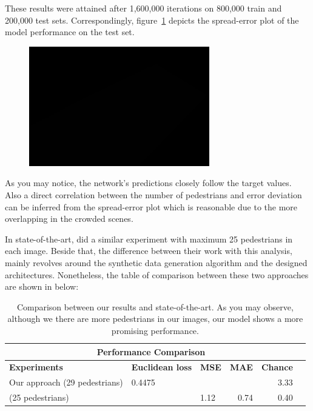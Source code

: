 These results were attained after 1,600,000 iterations on 800,000 train and 200,000 test sets. Correspondingly, figure~\ref{fig:splot} depicts the spread-error plot of the model performance on the test set.

\begin{figure}[H]
	\centering
	{\includegraphics[width=0.7\textwidth]{images/1}}
	\caption{}
	\label{fig:splot}
\end{figure}

As you may notice, the network's predictions closely follow the target values. Also a direct correlation between the number of pedestrians and error deviation can be inferred from the spread-error plot which is reasonable due to the more overlapping in the crowded scenes. 

\noindent In state-of-the-art, \citeauthor*{segui2015learning} did a similar experiment with maximum 25 pedestrians in each image. Beside that, the difference between their work with this analysis, mainly revolves around the synthetic data generation algorithm and the designed architectures. Nonetheless, the table of comparison between these two approaches are shown in below:
 
\begin{table}[H]
\centering
\small\sffamily
\begin{tabular}{lllrrr}
\multicolumn{5}{c}{\textbf{\textbf{Performance Comparison}}} \\
\bottomrule
\textbf{Experiments} &\textbf{Euclidean loss}&\textbf{MSE} &\textbf{MAE}& \textbf{Chance} \\
\bottomrule
Our approach (29 pedestrians)              & 0.4475    &      &          & 3.33 \\
\citet{segui2015learning} (25 pedestrians) &           & 1.12 & 0.74     & 0.40 \\
\bottomrule
\end{tabular}
\caption{Comparison between our results and state-of-the-art. As you may observe, although we there are more pedestrians in our images, our model shows a more promising performance.  }
\label{tab:}
\end{table} 



